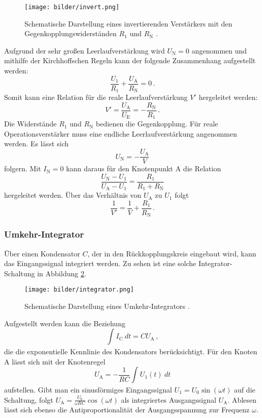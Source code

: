   \begin{figure}[H]
    \centering
    \texttt{[image: bilder/invert.png]}
    \caption{Schematische Darstellung eines invertierenden Verstärkers mit den Gegenkopplungswiderständen $R_1$ und $R_\text{N}$ \cite{anleitung}.}
    \label{invert}
  \end{figure}

Aufgrund der sehr großen Leerlaufverstärkung wird $U_\text{N}=0$ angenommen und mithilfe der Kirchhoffschen Regeln kann der folgende Zusammenhang aufgestellt werden:
\begin{equation}
  \frac{U_1}{R_1}+\frac{U_\text{A}}{R_\text{N}}=0\,.
\end{equation}
  Somit kann eine Relation für die reale Leerlaufverstärkung $V'$ hergeleitet werden:
  \begin{equation}
    V'=\frac{U_\text{A}}{U_\text{E}}=-\frac{R_\text{N}}{R_1}\,.
  \end{equation}
  Die Widerstände $R_1$ und $R_\text{N}$ bedienen die Gegenkopplung. Für reale Operationsverstärker muss eine endliche Leerlaufverstärkung angenommen werden. Es lässt sich
  \begin{equation}
    U_\text{N}=-\frac{U_\text{A}}{V}
  \end{equation}
  folgern.
  Mit $I_\text{N}=0$ kann daraus für den Knotenpunkt A die Relation
  \begin{equation}
    \frac{U_\text{N}-U_1}{U_\text{A}-U_1}=\frac{R_1}{R_1+R_\text{N}}
  \end{equation}
  hergeleitet werden. Über das Verhältnis von $U_\text{A}$ zu $U_1$ folgt
  \begin{equation}
    \frac{1}{V'}=\frac{1}{V}+\frac{R_1}{R_\text{N}}\,.
  \end{equation}
\subsubsection{Umkehr-Integrator}
Über einen Kondensator $C$, der in den Rückkopplungskreis eingebaut wird, kann das Eingangssignal integriert werden. Zu sehen ist eine solche Integrator-Schaltung in Abbildung \ref{integrator}.

\begin{figure}[H]
  \centering
  \texttt{[image: bilder/integrator.png]}
  \caption{Schematische Darstellung eines Umkehr-Integrators \cite{anleitung}.}
  \label{integrator}
\end{figure}

Aufgestellt werden kann die Beziehung
\begin{equation}
  \int_{}^{} I_\text{C} \ dt=CU_\text{A}\,,
\end{equation}
die die exponentielle Kennlinie des Kondensators berücksichtigt.
Für den Knoten A lässt sich mit der Knotenregel
\begin{equation}
  U_\text{A}=-\frac{1}{RC}\int_{}^{} U_1(t) \ dt
\end{equation}
aufstellen. Gibt man ein sinusförmiges Eingangssignal $U_1=U_0\sin(\omega t)$ auf die Schaltung, folgt $U_\text{A}=\frac{U_0}{\omega RC}\cos(\omega t)$ als integriertes Ausgangssignal $U_\text{A}$. Ablesen lässt sich ebenso die Antiproportionalität der Ausgangsspannung zur Frequenz $\omega$.
